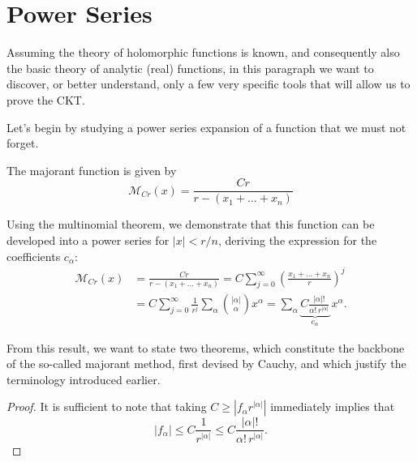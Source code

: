 \newpage
\section{Power Series}\label{powerseries}
Assuming the theory of holomorphic functions is known, and consequently also the basic theory of analytic (real) functions, in this paragraph we want to discover, or better understand, only a few very specific tools that will allow us to prove the CKT.

Let’s begin by studying a power series expansion of a function that we must not forget.
\begin{definition}
The majorant function is given by $$\mathcal{M}_{Cr}(x)=\frac{Cr}{r-(x_1+\ldots +x_n)}$$
\end{definition}
Using the multinomial theorem, we demonstrate that this function can be developed into a power series for $|x|<r/n$, deriving the expression for the coefficients $c_\alpha$:
\begin{align*}
\mathcal{M}_{Cr}(x) &= \frac{Cr}{r-(x_1+\ldots +x_n)} = C \sum\limits_{j=0}^\infty \left(\frac{x_1+\ldots +x_n}{r}\right)^j  \\ 
&= C \sum\limits_{j=0}^\infty \frac{1}{r^j} \sum\limits_\alpha  \binom{|\alpha |}{\alpha } x^\alpha = \sum\limits_\alpha 
\underbrace{C \frac{|\alpha |!}{\alpha ! \, r^{|\alpha |}}}_{c_\alpha} \, x^\alpha .
\end{align*}

From this result, we want to state two theorems, which constitute the backbone of the so-called majorant method, first devised by Cauchy, and which justify the terminology introduced earlier.

\begin{theorem}\label{theomaj}
\end{theorem}

\begin{theorem}\label{constmaj}
\end{theorem}

\begin{proof}
It is sufficient to note that taking $C \geq |f_\alpha r^{|\alpha |}|$ immediately implies that
$$|f_\alpha | \leq C \frac{1}{r^{|\alpha |}} \leq C \frac{|\alpha |!}{\alpha ! \, r^{|\alpha |}}.$$
\end{proof}

